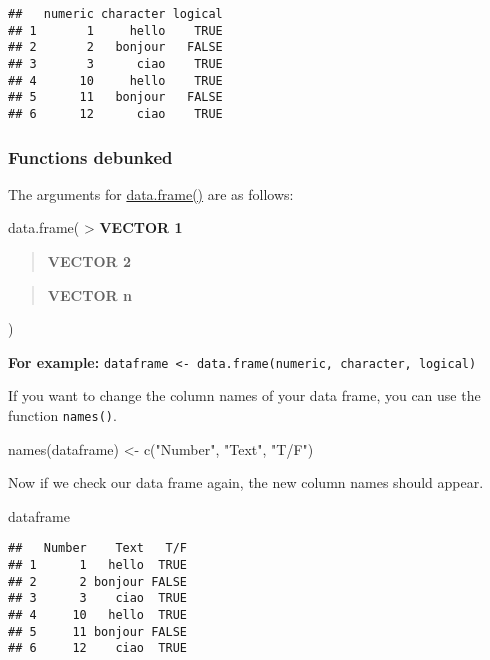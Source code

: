 \documentclass[
]{book}
\newenvironment{Shaded}{\begin{snugshade}}{\end{snugshade}}
\newcommand{\FunctionTok}[1]{\textcolor[rgb]{0.00,0.00,0.00}{#1}}
\newcommand{\NormalTok}[1]{#1}
\newcommand{\OtherTok}[1]{\textcolor[rgb]{0.56,0.35,0.01}{#1}}
\newcommand{\StringTok}[1]{\textcolor[rgb]{0.31,0.60,0.02}{#1}}
\begin{document}
\begin{verbatim}
##   numeric character logical
## 1       1     hello    TRUE
## 2       2   bonjour   FALSE
## 3       3      ciao    TRUE
## 4      10     hello    TRUE
## 5      11   bonjour   FALSE
## 6      12      ciao    TRUE
\end{verbatim}

\hypertarget{functions-debunked-2}{%
\subsubsection{Functions debunked}\label{functions-debunked-2}}

The arguments for \href{https://www.rdocumentation.org/packages/base/versions/3.6.2/topics/data.frame}{data.frame()} are as follows:

data.frame(
\textgreater{} \textbf{VECTOR 1}

\begin{quote}
\textbf{VECTOR 2}
\end{quote}

\begin{quote}
\textbf{VECTOR n}
\end{quote}

)

\textbf{For example:} \texttt{dataframe\ \textless{}-\ data.frame(numeric,\ character,\ logical)}

If you want to change the column names of your data frame, you can use the function \texttt{names()}.

\begin{Shaded}
\begin{Highlighting}[]
\FunctionTok{names}\NormalTok{(dataframe) }\OtherTok{\textless{}{-}} \FunctionTok{c}\NormalTok{(}\StringTok{"Number"}\NormalTok{, }\StringTok{"Text"}\NormalTok{, }\StringTok{"T/F"}\NormalTok{)}
\end{Highlighting}
\end{Shaded}

Now if we check our data frame again, the new column names should appear.

\begin{Shaded}
\begin{Highlighting}[]
\NormalTok{dataframe}
\end{Highlighting}
\end{Shaded}

\begin{verbatim}
##   Number    Text   T/F
## 1      1   hello  TRUE
## 2      2 bonjour FALSE
## 3      3    ciao  TRUE
## 4     10   hello  TRUE
## 5     11 bonjour FALSE
## 6     12    ciao  TRUE
\end{verbatim}
\end{document}
